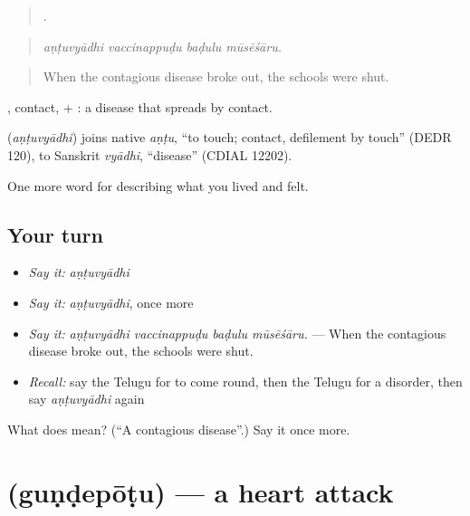 \begin{quote}
   .
\end{quote}

\begin{quote}
\emph{aṇṭuvyādhi vaccinappuḍu baḍulu mūsēśāru.}
\end{quote}

\begin{quote}
When the contagious disease broke out, the schools were shut.
\end{quote}

, contact, + : a disease that spreads by contact.

\begin{cousinweb}
\textbf{} (\emph{aṇṭuvyādhi}) joins native \emph{aṇṭu}, \textquotedblleft{}to touch; contact, defilement by touch\textquotedblright{} (DEDR 120), to Sanskrit \emph{vyādhi}, \textquotedblleft{}disease\textquotedblright{} (CDIAL 12202).
\end{cousinweb}

\begin{grammarlens}[title={What you've built}]
One more word for describing what you lived and felt.
\end{grammarlens}

\subsection*{Your turn}
\begin{itemize}
\raggedright
  \item \emph{Say it:} \emph{aṇṭuvyādhi}
  \item \emph{Say it:} \emph{aṇṭuvyādhi}, once more
  \item \emph{Say it:} \emph{aṇṭuvyādhi vaccinappuḍu baḍulu mūsēśāru.} — When the contagious disease broke out, the schools were shut.
  \item \emph{Recall:} say the Telugu for to come round, then the Telugu for a disorder, then say \emph{aṇṭuvyādhi} again
\end{itemize}

\begin{tcolorbox}[breakable,colback=teal!4,colframe=teal!35!black,title={Before you move on}]
What does  mean? (\textquotedblleft{}A contagious disease\textquotedblright{}.) Say it once more.
\end{tcolorbox}
\section[\texorpdfstring{\te{గుండెపోటు} (guṇḍepōṭu)}{గుండెపోటు (guṇḍepōṭu)}]{ (guṇḍepōṭu) — a heart attack}

